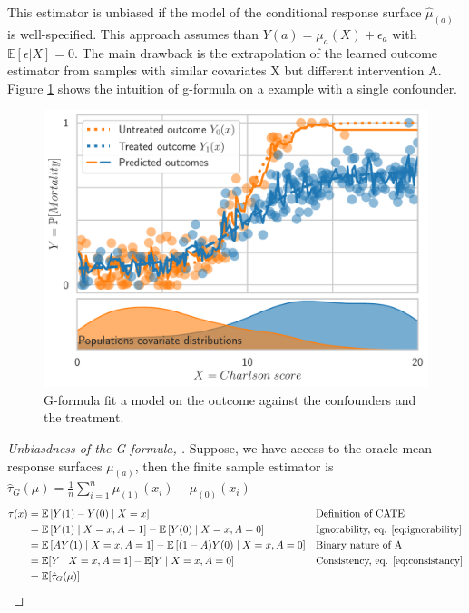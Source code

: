 \documentclass[french,12pt,twoside,a4paper]{book}
\newtheorem{proof}{Proof}
\begin{document}
\begin{appendices}
  This estimator is unbiased if the model of the conditional response surface
  $\hat \mu_{(a)}$ is well-specified. This approach assumes than $Y(a) =
    \mu_a(X) + \epsilon_a$ with $\mathbb E[\epsilon|X] = 0$. The main drawback is
  the extrapolation of the learned outcome estimator from samples with similar
  covariates X but different intervention A. Figure \ref{apd:gformula_intuition}
  shows the intuition of g-formula on a example with a single confounder.

  \begin{figure}[!b]
    \centering
    \includegraphics[width=0.8\linewidth]{img/chapter_4/outcome_model__RandomForestRegressor.pdf}
    \caption{G-formula fit a model on the outcome against the confounders and the treatment.}
    \label{apd:gformula_intuition}
  \end{figure}

  \begin{proof}[Unbiasdness of the G-formula, \citep{robins_role_1986}]
    Suppose, we have access to the oracle mean response surfaces $\mu_{(a)}$,
    then the finite sample estimator is $\hat{\tau}_G(\mu) = \frac{1}{n}
      \sum_{i=1}^n  \mu_{(1)}(x_i) -  \mu_{(0)}(x_i)$
    \begin{align*}
      \tau(x) & =\mathbb{E}\left[Y(1)-Y(0) \mid X=x\right]                                                   &  & \text{Definition of CATE}                      \\
              & =\mathbb{E}\left[Y(1) \mid X=x, A=1\right]-\mathbb{E}\left[Y(0) \mid X=x, A=0\right]         &  & \text{Ignorability, eq. \ref{eq:ignorability}} \\
              & =\mathbb{E}\left[A Y(1) \mid X=x, A=1\right]-\mathbb{E}\left[(1-A) Y(0) \mid X=x, A=0\right] &  & \text{Binary nature of A}                      \\
              & =\mathbb{E}[Y \mid X=x, A=1]-\mathbb{E}[Y \mid X=x, A=0]                                     &  & \text{Consistency, eq. \ref{eq:consistancy}}   \\
              & =\mathbb{E}[\hat{\tau}_G(\mu)]                                                               &  &
    \end{align*}
  \end{proof}


\end{appendices}
\end{document}
